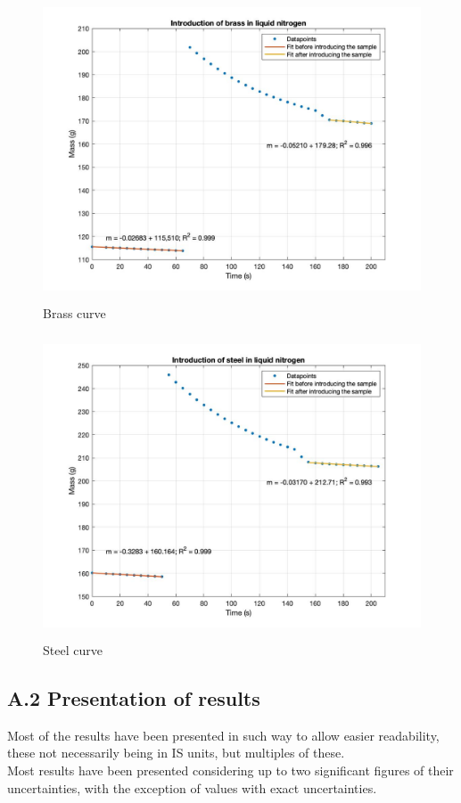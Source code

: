 \documentclass[a4paper, 12pt]{article}
\begin{document}
	\begin{figure}[hbt!]
		\centering
		\caption{Brass curve}
		\includegraphics[height=9cm]{brasscurve}
	\end{figure}

	\begin{figure}[hbt!]
		\centering
		\caption{Steel curve}
		\includegraphics[height=9cm]{steelcurve}
	\end{figure}
\normalsize{}
	\subsection{A.2 Presentation of results}
	Most of the results have been presented in such way to allow easier readability, these not necessarily being in IS units, but multiples of these.\\
	 
	Most results have been presented considering up to two significant figures of their uncertainties, with the exception of values with exact uncertainties.\\
	
\end{document}
